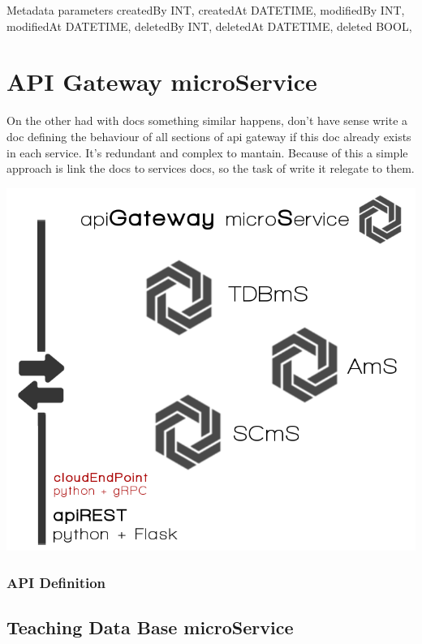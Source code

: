   Metadata parameters
  createdBy       INT,
  createdAt       DATETIME,
  modifiedBy      INT,
  modifiedAt      DATETIME,
  deletedBy       INT,
  deletedAt       DATETIME,
  deleted         BOOL,

\section{API Gateway microService}

On the other had with docs something similar happens, don't have sense
write a doc defining the behaviour of all sections of api gateway
if this doc already exists in each service. It's redundant and complex
to mantain. Because of this a simple approach is link the docs to
services docs, so the task of write it relegate to them.


\begin{center}
\includegraphics[scale=0.35]{img/graphics/apigateway.png}
\end{center}

\subsubsection {API Definition}






\subsection{Teaching Data Base microService}


